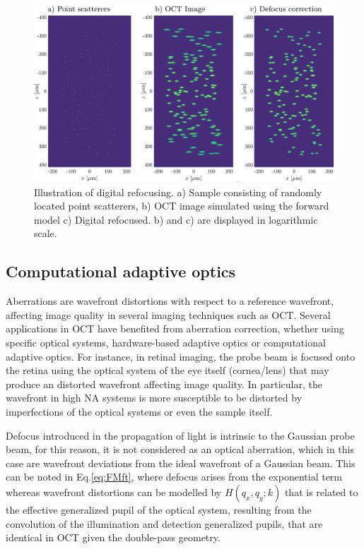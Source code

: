 \begin{figure}[htb!]
    \centering
    \includegraphics[width=\textwidth]{Figures/TheoreticalBasis/IM2.pdf}
    \caption{Illustration of digital refocusing. a) Sample consisting of randomly located point scatterers, b) OCT image simulated using the forward model c) Digital refocused. b) and c) are displayed in logarithmic scale.}
    \label{fig:IM2}
\end{figure}

\subsection{Computational adaptive optics}

Aberrations are wavefront distortions with respect to a reference wavefront, affecting image quality in several imaging techniques such as OCT. Several applications in OCT have benefited from aberration correction, whether using specific optical systems, hardware-based adaptive optics or computational adaptive optics. For instance, in retinal imaging, the probe beam is focused onto the retina using the optical system of the eye itself (cornea/lens) that may produce an distorted wavefront affecting image quality. In particular, the wavefront in high NA systems is more susceptible to be distorted by imperfections of the optical systems or even the sample itself.

Defocus introduced in the propagation of light is intrinsic to the Gaussian probe beam, for this reason, it is not considered as an optical aberration, which in this case are wavefront deviations from the ideal wavefront of a Gaussian beam. This can be noted in Eq.\eqref{eq:FMft}, where defocus arises from the exponential term whereas wavefront distortions can be modelled by $H(q_x, q_y; k)$ that is related to the effective generalized pupil of the optical system, resulting from the convolution of the illumination and detection generalized pupils, that are identical in OCT given the double-pass geometry.

